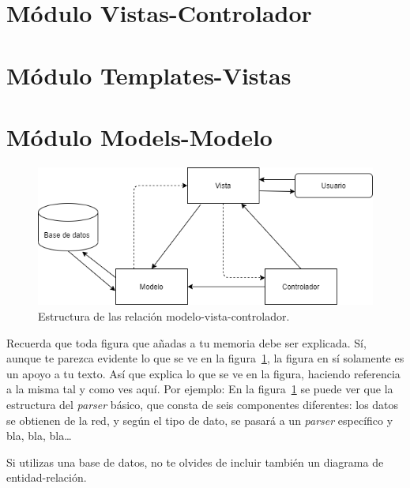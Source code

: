 \documentclass[a4paper, 12pt]{book}
\begin{document}
\section{Módulo Vistas-Controlador}


\section{Módulo Templates-Vistas}


\section{Módulo Models-Modelo}

\begin{figure}
  \centering
  \includegraphics[width=12cm, keepaspectratio]{img/model-vista-controlador.png}
  \caption{Estructura de las relación modelo-vista-controlador.}\label{fig:arquitectura}
\end{figure}

 
Recuerda que toda figura que añadas a tu memoria debe ser explicada.
Sí, aunque te parezca evidente lo que se ve en la figura~\ref{fig:arquitectura}, la figura en sí solamente es un apoyo a tu texto.
Así que explica lo que se ve en la figura, haciendo referencia a la misma tal y como ves aquí.
Por ejemplo: En la figura~\ref{fig:arquitectura} se puede ver que la estructura del \emph{parser} básico, que consta de seis componentes diferentes: los datos se obtienen de la red, y según el tipo de dato, se pasará a un \emph{parser} específico y bla, bla, bla\ldots

Si utilizas una base de datos, no te olvides de incluir también un diagrama de entidad-relación.





\end{document}
